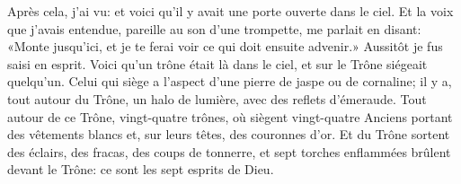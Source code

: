 Après cela, j’ai vu:
	et voici qu’il y avait une porte ouverte dans le ciel.
Et la voix que j’avais entendue, pareille au son d’une trompette,
	me parlait en disant:
	«Monte jusqu’ici, et je te ferai voir ce qui doit ensuite advenir.»
Aussitôt je fus saisi en esprit.
Voici qu’un trône était là dans le ciel,
	et sur le Trône siégeait quelqu’un.
Celui qui siège a l’aspect d’une pierre de jaspe ou de cornaline;
	il y a, tout autour du Trône,
	un halo de lumière, avec des reflets d’émeraude.
Tout autour de ce Trône, vingt-quatre trônes,
	où siègent vingt-quatre Anciens portant des vêtements blancs
	et, sur leurs têtes, des couronnes d’or.
Et du Trône sortent des éclairs, des fracas, des coups de tonnerre,
	et sept torches enflammées brûlent devant le Trône:
	ce sont les sept esprits de Dieu.

